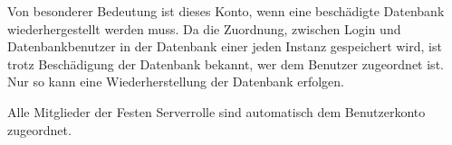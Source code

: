             Von besonderer Bedeutung ist dieses Konto, wenn eine beschädigte
            Datenbank wiederhergestellt werden muss. Da die Zuordnung, zwischen
            Login und Datenbankbenutzer in der Datenbank 
            einer jeden Instanz gespeichert wird, ist trotz Beschädigung der
            Datenbank bekannt, wer dem Benutzer  zugeordnet ist.
            Nur so kann eine Wiederherstellung der Datenbank erfolgen.
            \begin{merke}
              Alle Mitglieder der Festen Serverrolle  sind
              automatisch dem Benutzerkonto  zugeordnet.
            \end{merke}
            \begin{literaturinternet}
              \item \cite{bb669065}
            \end{literaturinternet}
